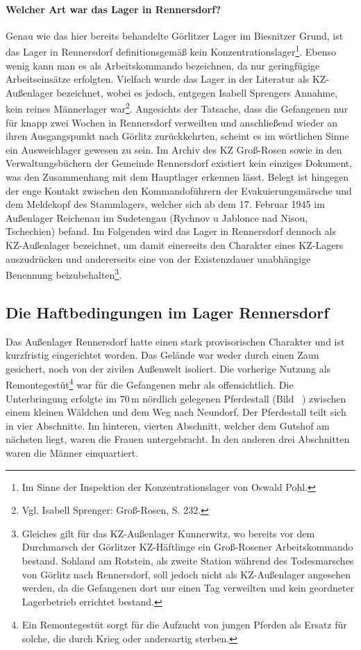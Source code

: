 \paragraph{Welcher Art war das Lager in Rennersdorf?} Genau wie das hier bereits behandelte Görlitzer Lager im Biesnitzer Grund, ist das Lager in Rennersdorf definitionsgemäß kein Konzentrationslager\footnote{Im Sinne der Inspektion der Konzentrationslager von Oswald Pohl.}. Ebenso wenig kann man es als Arbeitskommando bezeichnen, da nur geringfügige Arbeitseinsätze erfolgten. 
Vielfach wurde das Lager in der Literatur als KZ-Außenlager bezeichnet, wobei es jedoch, entgegen Isabell Sprengers Annahme, kein reines Männerlager war\footnote{Vgl. Isabell Sprenger: Groß-Rosen, S. 232.}. Angesichts der Tatsache, dass die Gefangenen nur für knapp zwei Wochen in Rennersdorf verweilten und anschließend wieder an ihren Ausgangspunkt nach Görlitz zurückkehrten, scheint es im wörtlichen Sinne ein Ausweichlager gewesen zu sein. Im Archiv des KZ Groß-Rosen sowie in den Verwaltungsbüchern der Gemeinde Rennersdorf existiert kein einziges Dokument, was den Zusammenhang mit dem Hauptlager erkennen lässt. Belegt ist hingegen der enge Kontakt zwischen den Kommandoführern der Evakuierungsmärsche und dem Meldekopf des Stammlagers, welcher sich ab dem 17. Februar 1945 im Außenlager Reichenau im Sudetengau (Rychnov u Jablonce nad Nisou, Tschechien) befand. 
Im Folgenden wird das Lager in Rennersdorf dennoch als KZ-Außenlager bezeichnet, um damit einerseits den Charakter eines KZ-Lagers auszudrücken und andererseits eine von der Existenzdauer unabhängige Benennung beizubehalten\footnote{Gleiches gilt für das KZ-Außenlager Kunnerwitz, wo bereits vor dem Durchmarsch der Görlitzer KZ-Häftlinge ein Groß-Rosener Arbeitskommando bestand. Sohland am Rotstein, als zweite Station während des Todesmarsches von Görlitz nach Rennersdorf, soll jedoch nicht als KZ-Außenlager angesehen werden, da die Gefangenen dort nur einen Tag verweilten und kein geordneter Lagerbetrieb errichtet bestand.}. 





\subsection{Die Haftbedingungen im Lager Rennersdorf}
Das Außenlager Rennersdorf hatte einen stark provisorischen Charakter und ist kurzfristig eingerichtet worden. Das Gelände war weder durch
einen Zaun gesichert, noch von der zivilen Außenwelt isoliert. Die vorherige Nutzung als Remontegestüt\footnote{Ein Remontegestüt sorgt für die Aufzucht von jungen Pferden als Ersatz für solche, die durch Krieg oder andersartig sterben.} war für die Gefangenen mehr als offensichtlich. Die Unterbringung erfolgte im 70\,m nördlich gelegenen Pferdestall (Bild ~) zwischen einem kleinen Wäldchen und dem Weg nach Neundorf.
Der Pferdestall teilt sich in vier Abschnitte. Im hinteren, vierten Abschnitt, welcher dem Gutshof am nächsten liegt, waren die Frauen untergebracht. In den anderen drei Abschnitten waren die Männer einquartiert.

